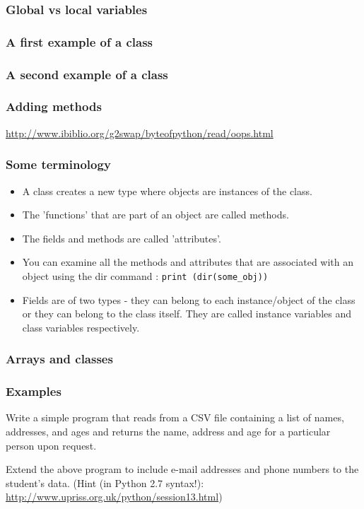 \documentclass{beamer}
\begin{document}
\begin{frame}[containsverbatim]
\frametitle{Global vs local variables}

\end{frame}

\begin{frame}[containsverbatim]
\frametitle{A first example of a class}

\end{frame}

\begin{frame}[containsverbatim]
\frametitle{A second example of a class}

\end{frame}

\begin{frame}[containsverbatim]
\frametitle{Adding methods}

\url{http://www.ibiblio.org/g2swap/byteofpython/read/oops.html}
\end{frame}

\begin{frame}
\frametitle{Some terminology}
\begin{itemize}
\item A class creates a new type where objects are instances of the class.
\item The 'functions' that are part of an object are called methods.
\item The fields and methods are called 'attributes'.
\item You can examine all the methods and attributes that are associated with an object using the dir command :
\texttt{print (dir(some\_obj))}
\item Fields are of two types - they can belong to each instance/object of the class or they can belong to the class itself. They are called instance variables and class variables respectively.
\end{itemize}
\end{frame}

\begin{frame}[containsverbatim]
\frametitle{Arrays and classes}

\end{frame}

\begin{frame}
\frametitle{Examples}
\begin{example}
Write a simple program that reads from a CSV file containing a list of names, addresses, and ages and returns the name, address and age for a particular person upon request.
\end{example}
\begin{example}
Extend the above program to include e-mail addresses and phone numbers to the student's data. (Hint (in Python 2.7 syntax!): \url{http://www.upriss.org.uk/python/session13.html})
\end{example}
\end{frame}
\end{document}
